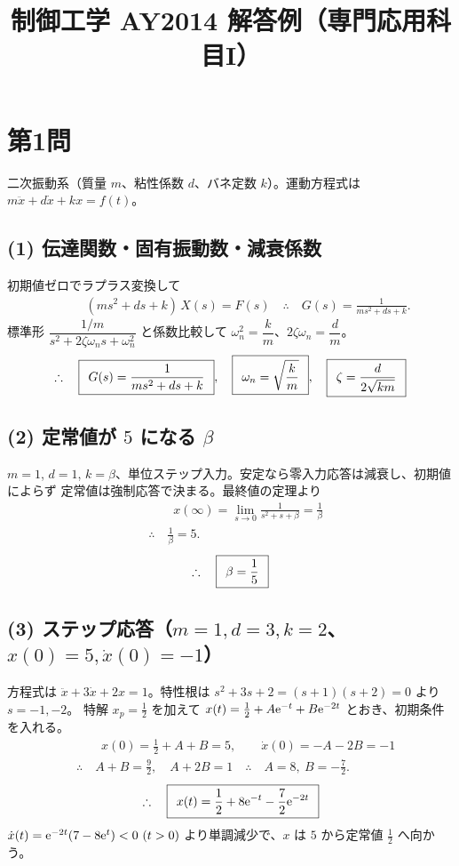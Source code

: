 \documentclass[11pt,a4paper]{article}
\title{制御工学 AY2014 解答例（専門応用科目I）}
\author{}
\date{}
\begin{document}
\maketitle

\section*{第1問}

二次振動系（質量 $m$、粘性係数 $d$、バネ定数 $k$）。運動方程式は $m\ddot{x}+d\dot{x}+kx=f(t)$。

\subsection*{(1) 伝達関数・固有振動数・減衰係数}
初期値ゼロでラプラス変換して
\begin{align*}
  &\qquad (ms^2+ds+k)\,X(s)=F(s)
   \quad\therefore\quad G(s)=\frac{1}{ms^2+ds+k}.
\end{align*}
標準形 $\dfrac{1/m}{s^2+2\zeta\omega_n s+\omega_n^2}$ と係数比較して $\omega_n^2=\dfrac{k}{m}$、$2\zeta\omega_n=\dfrac{d}{m}$。
\[
  \therefore\quad \boxed{\,\;G(s)=\dfrac{1}{ms^2+ds+k}\;\,},\quad
  \boxed{\,\;\omega_n=\sqrt{\dfrac{k}{m}}\;\,},\quad
  \boxed{\,\;\zeta=\dfrac{d}{2\sqrt{km}}\;\,}
\]

\subsection*{(2) 定常値が $5$ になる $\beta$}
$m=1$, $d=1$, $k=\beta$、単位ステップ入力。安定なら零入力応答は減衰し、初期値によらず
定常値は強制応答で決まる。最終値の定理より
\begin{align*}
  &\qquad x(\infty)=\lim_{s\to0}\frac{1}{s^2+s+\beta}=\frac{1}{\beta}\\
  &\therefore\quad \frac{1}{\beta}=5.
\end{align*}
\[
  \therefore\quad \boxed{\,\;\beta=\dfrac15\;\,}
\]

\subsection*{(3) ステップ応答（$m=1,d=3,k=2$、$x(0)=5,\dot x(0)=-1$）}
方程式は $\ddot{x}+3\dot{x}+2x=1$。特性根は $s^2+3s+2=(s+1)(s+2)=0$ より $s=-1,-2$。
特解 $x_p=\tfrac12$ を加えて $x(t)=\tfrac12+A\mathrm{e}^{-t}+B\mathrm{e}^{-2t}$ とおき、初期条件を入れる。
\begin{align*}
  &\qquad x(0)=\tfrac12+A+B=5,\qquad \dot{x}(0)=-A-2B=-1\\
  &\therefore\quad A+B=\tfrac92,\quad A+2B=1
   \quad\therefore\quad A=8,\ B=-\tfrac72.
\end{align*}
\[
  \therefore\quad \boxed{\,\;x(t)=\dfrac12+8\mathrm{e}^{-t}-\dfrac72\mathrm{e}^{-2t}\;\,}
\]
$\dot{x}(t)=\e^{-2t}(7-8\e^{t})<0\ (t>0)$ より単調減少で、$x$ は $5$ から定常値 $\tfrac12$ へ向かう。
\end{document}
